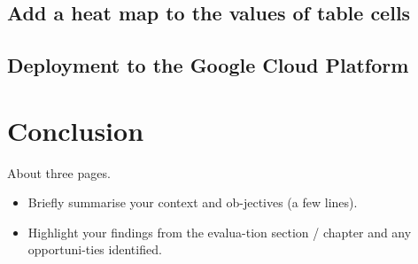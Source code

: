 \section{Add a heat map to the values of table cells}
\section{Deployment to the Google Cloud Platform}
	


\chapter{Conclusion}
About three pages.

\begin{itemize}
\item Briefly summarise your context and ob-jectives (a few lines).
\item Highlight your findings from the evalua-tion section / chapter and any opportuni-ties identified.
\end{itemize}

